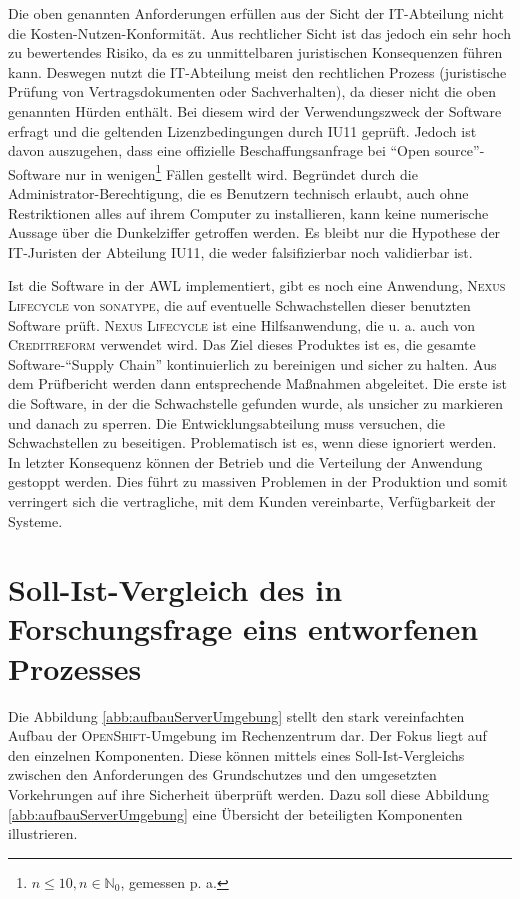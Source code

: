 Die oben genannten Anforderungen erfüllen aus der Sicht der IT-Abteilung nicht die Kosten-Nutzen-Konformität. Aus rechtlicher Sicht ist das jedoch ein sehr hoch zu bewertendes Risiko, da es zu unmittelbaren juristischen Konsequenzen führen kann. Deswegen nutzt die IT-Abteilung meist den rechtlichen Prozess (juristische Prüfung von Vertragsdokumenten oder Sachverhalten), da dieser nicht die oben genannten Hürden enthält. Bei diesem wird der Verwendungszweck der Software erfragt und die geltenden Lizenzbedingungen durch \ac{IU11} geprüft. Jedoch ist davon auszugehen, dass eine offizielle Beschaffungsanfrage bei \enquote{Open source}-Software nur in wenigen\footnote{$ n \leq 10, n \in \mathbb{N}_{0} $, gemessen p. a.} Fällen gestellt wird. Begründet durch die Administrator-Berechtigung, die es Benutzern technisch erlaubt, auch ohne Restriktionen alles auf ihrem Computer zu installieren, kann keine numerische Aussage über die Dunkelziffer getroffen werden. Es bleibt nur die Hypothese der IT-Juristen der Abteilung \ac{IU11}, die weder falsifizierbar noch validierbar ist. 
\par
Ist die Software in der \ac{AWL} implementiert, gibt es noch eine Anwendung, \textsc{Nexus Lifecycle} von \textsc{sonatype}, die auf eventuelle Schwachstellen dieser benutzten Software prüft. \textsc{Nexus Lifecycle} ist eine Hilfsanwendung, die u. a. auch von \textsc{Creditreform} verwendet wird. Das Ziel dieses Produktes ist es, die gesamte Software-\enquote{Supply Chain} kontinuierlich zu bereinigen und sicher zu halten.\autocite[vgl.][]{sonatype_inc_nexus_2020} Aus dem Prüfbericht werden dann entsprechende Maßnahmen abgeleitet. Die erste ist die Software, in der die Schwachstelle gefunden wurde, als unsicher zu markieren und danach zu sperren. Die Entwicklungsabteilung muss versuchen, die Schwachstellen zu beseitigen. Problematisch ist es, wenn diese ignoriert werden. In letzter Konsequenz können der Betrieb und die Verteilung der Anwendung gestoppt werden. Dies führt zu massiven Problemen in der Produktion und somit verringert sich die vertragliche, mit dem Kunden vereinbarte, Verfügbarkeit der Systeme.

\section{Soll-Ist-Vergleich des in Forschungsfrage eins entworfenen Prozesses}
Die Abbildung \vref{abb:aufbauServerUmgebung} stellt den stark vereinfachten Aufbau der \textsc{OpenShift}-Umgebung im Rechenzentrum dar. Der Fokus liegt auf den einzelnen Komponenten. Diese können mittels eines Soll-Ist-Vergleichs zwischen den Anforderungen des Grundschutzes und den umgesetzten Vorkehrungen auf ihre Sicherheit überprüft werden. Dazu soll diese Abbildung \vref{abb:aufbauServerUmgebung} eine Übersicht der beteiligten Komponenten illustrieren. 


